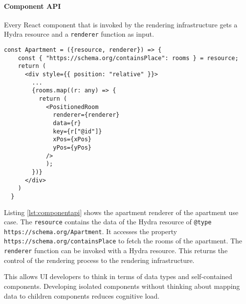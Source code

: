 \paragraph{Component API}
Every React component that is invoked by the rendering infrastructure gets a Hydra resource and a \lstinline{renderer} function as input.

\lstset{language=JSON}
\begin{lstlisting}[caption={React component API for the apartment renderer as shown in figure \ref{fig:apartmentrenderer}.}, label={lst:componentapi}]
  const Apartment = ({resource, renderer}) => {
    const { "https://schema.org/containsPlace": rooms } = resource;
    return (
      <div style={{ position: "relative" }}>
        ...
        {rooms.map((r: any) => {
          return (
            <PositionedRoom
              renderer={renderer}
              data={r}
              key={r["@id"]}
              xPos={xPos}
              yPos={yPos}
            />
            );
        })}
      </div>
    )
  }
\end{lstlisting}

Listing \ref{lst:componentapi} shows the apartment renderer of the apartment use case. The \lstinline{resource} contains the data of the Hydra resource of \lstinline{@type} \lstinline{https://schema.org/Apartment}. It accesses the property \lstinline{https://schema.org/containsPlace} to fetch the rooms of the apartment. The \lstinline{renderer} function can be invoked with a Hydra resource. This returns the control of the rendering process to the rendering infrastructure.

This allows UI developers to think in terms of data types and self-contained components. Developing isolated components without thinking about mapping data to children components reduces \gls{cognitive load}.

